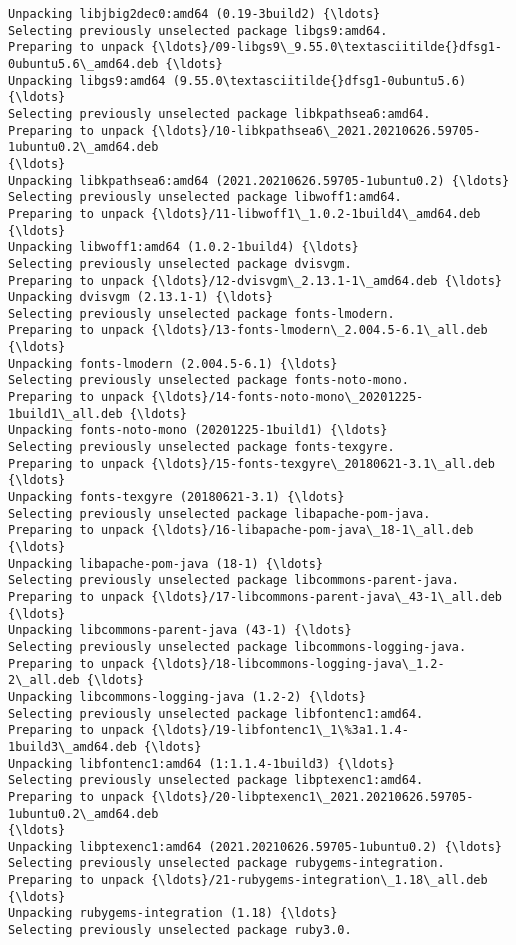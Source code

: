 \documentclass[11pt]{article}
\begin{document}
\begin{Verbatim}[commandchars=\\\{\}]
Unpacking libjbig2dec0:amd64 (0.19-3build2) {\ldots}
Selecting previously unselected package libgs9:amd64.
Preparing to unpack {\ldots}/09-libgs9\_9.55.0\textasciitilde{}dfsg1-0ubuntu5.6\_amd64.deb {\ldots}
Unpacking libgs9:amd64 (9.55.0\textasciitilde{}dfsg1-0ubuntu5.6) {\ldots}
Selecting previously unselected package libkpathsea6:amd64.
Preparing to unpack {\ldots}/10-libkpathsea6\_2021.20210626.59705-1ubuntu0.2\_amd64.deb
{\ldots}
Unpacking libkpathsea6:amd64 (2021.20210626.59705-1ubuntu0.2) {\ldots}
Selecting previously unselected package libwoff1:amd64.
Preparing to unpack {\ldots}/11-libwoff1\_1.0.2-1build4\_amd64.deb {\ldots}
Unpacking libwoff1:amd64 (1.0.2-1build4) {\ldots}
Selecting previously unselected package dvisvgm.
Preparing to unpack {\ldots}/12-dvisvgm\_2.13.1-1\_amd64.deb {\ldots}
Unpacking dvisvgm (2.13.1-1) {\ldots}
Selecting previously unselected package fonts-lmodern.
Preparing to unpack {\ldots}/13-fonts-lmodern\_2.004.5-6.1\_all.deb {\ldots}
Unpacking fonts-lmodern (2.004.5-6.1) {\ldots}
Selecting previously unselected package fonts-noto-mono.
Preparing to unpack {\ldots}/14-fonts-noto-mono\_20201225-1build1\_all.deb {\ldots}
Unpacking fonts-noto-mono (20201225-1build1) {\ldots}
Selecting previously unselected package fonts-texgyre.
Preparing to unpack {\ldots}/15-fonts-texgyre\_20180621-3.1\_all.deb {\ldots}
Unpacking fonts-texgyre (20180621-3.1) {\ldots}
Selecting previously unselected package libapache-pom-java.
Preparing to unpack {\ldots}/16-libapache-pom-java\_18-1\_all.deb {\ldots}
Unpacking libapache-pom-java (18-1) {\ldots}
Selecting previously unselected package libcommons-parent-java.
Preparing to unpack {\ldots}/17-libcommons-parent-java\_43-1\_all.deb {\ldots}
Unpacking libcommons-parent-java (43-1) {\ldots}
Selecting previously unselected package libcommons-logging-java.
Preparing to unpack {\ldots}/18-libcommons-logging-java\_1.2-2\_all.deb {\ldots}
Unpacking libcommons-logging-java (1.2-2) {\ldots}
Selecting previously unselected package libfontenc1:amd64.
Preparing to unpack {\ldots}/19-libfontenc1\_1\%3a1.1.4-1build3\_amd64.deb {\ldots}
Unpacking libfontenc1:amd64 (1:1.1.4-1build3) {\ldots}
Selecting previously unselected package libptexenc1:amd64.
Preparing to unpack {\ldots}/20-libptexenc1\_2021.20210626.59705-1ubuntu0.2\_amd64.deb
{\ldots}
Unpacking libptexenc1:amd64 (2021.20210626.59705-1ubuntu0.2) {\ldots}
Selecting previously unselected package rubygems-integration.
Preparing to unpack {\ldots}/21-rubygems-integration\_1.18\_all.deb {\ldots}
Unpacking rubygems-integration (1.18) {\ldots}
Selecting previously unselected package ruby3.0.

\end{Verbatim}
\end{document}
